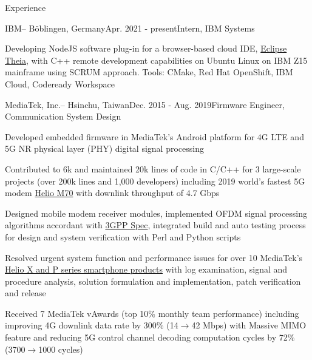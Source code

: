 \documentclass{resume} %
\begin{document}
\begin{rSection}{Experience}

\begin{rSubsection}{IBM}{--  Böblingen, Germany}{Apr. 2021 - present}{Intern, IBM Systems}
\item Developing NodeJS software plug-in for a browser-based cloud IDE, \href{https://theia-ide.org/}{Eclipse Theia}, with C++ remote development capabilities on Ubuntu Linux on IBM Z15 mainframe using SCRUM approach. Tools: CMake, Red Hat OpenShift, IBM Cloud, Codeready Workspace 
\end{rSubsection}

\begin{rSubsection}{MediaTek, Inc.}{--  Hsinchu, Taiwan}{Dec. 2015 - Aug. 2019}{Firmware Engineer, Communication System Design}

\item Developed embedded firmware in MediaTek’s Android platform for 4G LTE and 5G NR physical layer (PHY) digital signal processing
\item Contributed to 6k and maintained 20k lines of code in C/C++ for 3 large-scale projects (over 200k lines and 1,000 developers) including 2019 world’s fastest 5G modem  \href{https://www.mediatek.com/blog/heres-5gs-real-speed-live-connection-demo
}{Helio M70} with downlink throughput of 4.7 Gbps
\item Designed mobile modem receiver modules, implemented OFDM signal processing algorithms accordant with  \href{https://www.3gpp.org/specifications}{3GPP Spec}, integrated build and auto testing process for design and system verification with Perl and Python scripts 
\item Resolved urgent system function and performance issues for over 10 MediaTek’s \href{https://www.mediatek.com/products/smartphones}{Helio X and P series smartphone products} with log examination, signal and procedure analysis, solution formulation and implementation, patch verification and release

\item Received 7 MediaTek vAwards (top 10\% monthly team performance) including  improving 4G downlink data rate by 300\% (14$\rightarrow$42 Mbps) with Massive MIMO feature and reducing 5G control channel decoding computation  cycles by 72\% (3700$\rightarrow$1000 cycles)

\end{rSubsection}

\end{rSection}
\end{document}

